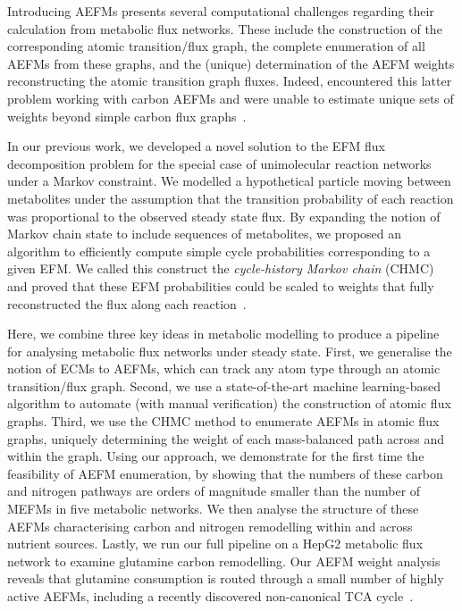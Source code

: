 \documentclass[12pt]{article}
\begin{document}
Introducing AEFMs presents several computational challenges regarding
their calculation from metabolic flux networks. These include the
construction of the corresponding atomic transition/flux graph, the
complete enumeration of all AEFMs from these graphs, and the (unique)
determination of the AEFM weights reconstructing the atomic transition
graph fluxes. Indeed, \citeauthor{PeyJon2012Itmd} encountered this latter
problem working with carbon AEFMs and were unable to estimate unique sets
of weights beyond simple carbon flux graphs~\citep{PeyJon2012Itmd}.

In our previous work, we developed a novel solution to the EFM flux
decomposition problem for the special case of unimolecular reaction
networks under a Markov constraint. We modelled a hypothetical particle
moving between metabolites under the assumption that the transition
probability of each reaction was proportional to the observed steady state
flux. By expanding the notion of Markov chain state to include sequences
of metabolites, we proposed an algorithm to efficiently compute simple
cycle probabilities corresponding to a given EFM. We called this construct
the \emph{cycle-history Markov chain} (CHMC) and proved that these EFM
probabilities could be scaled to weights that fully reconstructed the flux
along each reaction~\citep{ChitpinJustinG2023AMct}.

Here, we combine three key ideas in metabolic modelling to produce
a pipeline for analysing metabolic flux networks under steady state.
First, we generalise the notion of ECMs to AEFMs, which can track any atom
type through an atomic transition/flux graph. Second, we use
a state-of-the-art machine learning-based algorithm to automate (with
manual verification) the construction of atomic flux graphs. Third, we use
the CHMC method to enumerate AEFMs in atomic flux graphs, uniquely
determining the weight of each mass-balanced path across and within the
graph. Using our approach, we demonstrate for the first time the
feasibility of AEFM enumeration, by showing that the numbers of these
carbon and nitrogen pathways are orders of magnitude smaller than the
number of MEFMs in five metabolic networks. We then analyse the structure
of these AEFMs characterising carbon and nitrogen remodelling within and
across nutrient sources. Lastly, we run our full pipeline on a HepG2
metabolic flux network to examine glutamine carbon remodelling. Our AEFM
weight analysis reveals that glutamine consumption is routed through
a small number of highly active AEFMs, including a recently discovered
non-canonical TCA cycle~\citep{ArnoldPaigeK2022Anta}.
\end{document}
